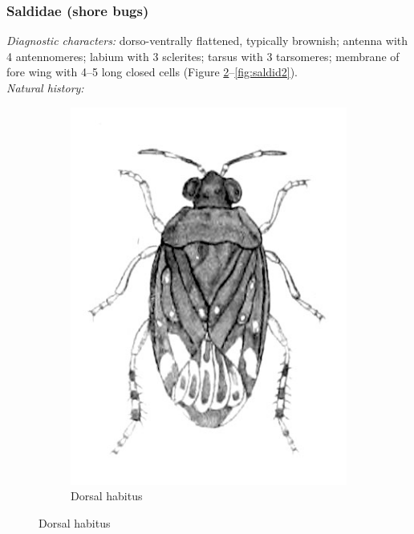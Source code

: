 \documentclass[letterpaper, 11pt]{article}
\begin{document}
\subsubsection{Saldidae (shore bugs)}
\noindent{}\textit{Diagnostic characters:} dorso-ventrally flattened, typically brownish; antenna with 4 antennomeres; labium with 3 sclerites; tarsus with 3 tarsomeres; membrane of fore wing with 4--5 long closed cells (Figure \ref{fig:saldid1}--\ref{fig:saldid2}).\\

\noindent{}\textit{Natural history:} \\

\begin{figure}[ht!]
 \centering
 \begin{subfigure}[ht!]{0.24\textwidth}
  \includegraphics[width=\textwidth]{SaldidHabitusInk}
  \caption{Dorsal habitus \citep[][Fig. 13]{bhl45742}}
  \label{fig:saldid1}
 \end{subfigure}

\end{figure}
\end{document}
